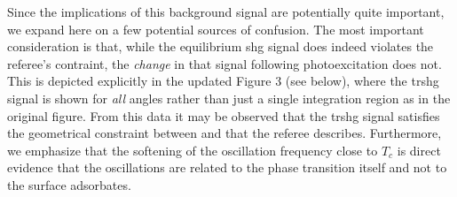 Since the implications of this background signal are potentially quite important, we expand here on a few potential sources of confusion. 
The most important consideration is that, while the equilibrium \gls{shg} signal does indeed violates the referee's contraint, the \textit{change} in that signal following photoexcitation does not.
This is depicted explicitly in the updated Figure 3 (see below), where the \gls{trshg} signal is shown for \textit{all} angles rather than just a single integration region as in the original figure.
From this data it may be observed that the \gls{trshg} signal satisfies the geometrical constraint between \PS and \SS that the referee describes.
Furthermore, we emphasize that the softening of the oscillation frequency close to $T_c$ is direct evidence that the oscillations are related to the phase transition itself and not to the surface adsorbates.

